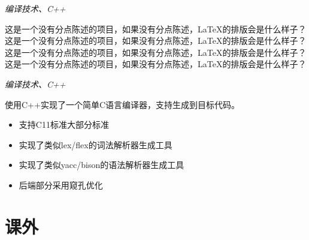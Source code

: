 \textit{编译技术、C++}
\vspace{0.4ex}

这是一个没有分点陈述的项目，如果没有分点陈述，LaTeX的排版会是什么样子？
这是一个没有分点陈述的项目，如果没有分点陈述，LaTeX的排版会是什么样子？
这是一个没有分点陈述的项目，如果没有分点陈述，LaTeX的排版会是什么样子？
这是一个没有分点陈述的项目，如果没有分点陈述，LaTeX的排版会是什么样子？

\textit{编译技术、C++}
\vspace{0.4ex}

使用C++实现了一个简单C语言编译器，支持生成到目标代码。
\begin{itemize}
  \item 支持C11标准大部分标准
  \item 实现了类似lex/flex的词法解析器生成工具
  \item 实现了类似yacc/bison的语法解析器生成工具
  \item 后端部分采用窥孔优化
\end{itemize}



\section{课外}
